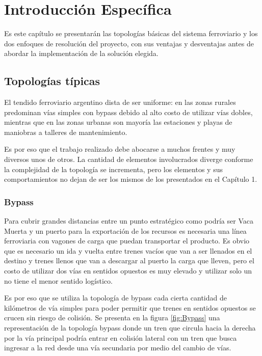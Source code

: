 \chapter{Introducción Específica} %

\label{Chapter2}

Es este capítulo se presentarán las topologías básicas del sistema ferroviario y los dos enfoques de resolución del proyecto, con sus ventajas y desventajas antes de abordar la implementación de la solución elegida.

\section{Topologías típicas}
	
	El tendido ferroviario argentino dista de ser uniforme: en las zonas rurales predominan vías simples con bypass debido al alto costo de utilizar vías dobles, mientras que en las zonas urbanas son mayoría las estaciones y playas de maniobras a talleres de mantenimiento.
	
	Es por eso que el trabajo realizado debe abocarse a muchos frentes y muy diversos unos de otros. La cantidad de elementos involucrados diverge conforme la complejidad de la topología se incrementa, pero los elementos y sus comportamientos no dejan de ser los mismos de los presentados en el Capítulo 1.

	\subsection{Bypass}

		Para cubrir grandes distancias entre un punto estratégico como podría ser Vaca Muerta y un puerto para la exportación de los recursos es necesaria una línea ferroviaria con vagones de carga que puedan transportar el producto. Es obvio que es necesario un ida y vuelta entre trenes vacíos que van a ser llenados en el destino y trenes llenos que van a descargar al puerto la carga que lleven, pero el costo de utilizar dos vías en sentidos opuestos es muy elevado y utilizar solo un no tiene el menor sentido logístico.
		
		Es por eso que se utiliza la topología de bypass cada cierta cantidad de kilómetros de vía simples para poder permitir que trenes en sentidos opuestos se crucen sin riesgo de colisión. Se presenta en la figura \ref{fig:Bypass} una representación de la topología bypass donde un tren que circula hacia la derecha por la vía principal podría entrar en colisión lateral con un tren que busca ingresar a la red desde una vía secundaria por medio del cambio de vías.
		
